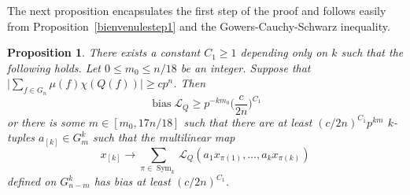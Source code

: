 \documentclass[a4paper,11pt]{article}
\newtheorem{proposition}[theorem]{Proposition}
\theoremstyle{definition}
\newcommand{\on}[1]{
	\operatorname{#1}
}
\begin{document}
The next proposition encapsulates the first step of the proof and follows easily from Proposition~\ref{bienvenulestep1} and the Gowers-Cauchy-Schwarz inequality.

\begin{proposition}\label{passtomultilemma}
    There exists a constant $C_1 \geq 1$ depending only on $k$ such that the following holds. Let $0 \leq m_0 \leq n/18$ be an integer. Suppose that  $\Big|\sum_{f\in G_n}\mu(f)\chi(Q(f))\Big| \geq c p^n$. Then
    \[\on{bias} \mathcal{L}_Q \geq p^{-km_0}\Big(\frac{c}{2n}\Big)^{C_1}\]
    or there is some $m \in [m_0, 17n/18]$ such that there are at least $(c/2n)^{C_1} p^{k m}$ $k$-tuples $a_{[k]}\in G_{m}^k$ such that the multilinear map 
    \[x_{[k]} \rightarrow \sum_{\pi \in \on{Sym}_k}\mathcal{L}_Q(a_1x_{\pi(1)},\ldots, a_k x_{\pi(k)})\]
    defined on $G_{n-m}^k$ has bias at least $(c/2n)^{C_1}$. 
\end{proposition} 
\end{document}
